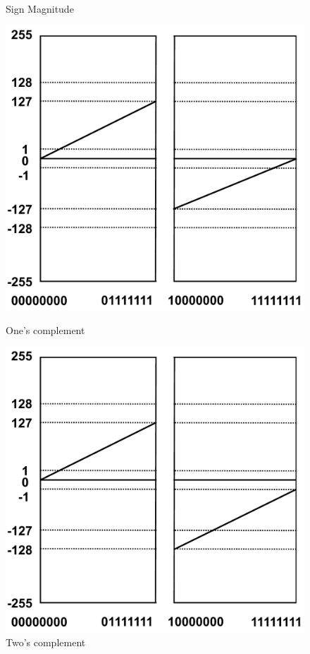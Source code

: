 \documentclass[addpoints, 12pt, answers]{exam}
\begin{document}
\begin{questions}
\begin{parts}
\begin{figure}[h]
\begin{minipage}[t]{0.35\textwidth}
        \caption*{Sign Magnitude}
        \end{minipage}  
        \hfill
        \begin{minipage}[t]{0.35\textwidth}
        \includegraphics[width=\linewidth]{number_ones_complement.pdf}
        \caption*{One's complement}
        \end{minipage}
        \hfill
        \begin{minipage}[t]{0.35\textwidth}
        \includegraphics[width=\linewidth]{number_twos_complement.pdf}
        \caption*{Two's complement}
        \end{minipage}  
    \end{figure}
    

\end{parts}
\end{questions}
\end{document}
